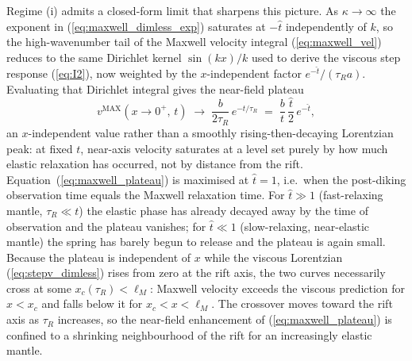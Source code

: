 \documentclass[extra]{gji}
\begin{document}
Regime (i) admits a closed-form limit that sharpens this picture. As
$\kappa\to\infty$ the exponent in (\ref{eq:maxwell_dimless_exp}) saturates
at $-\hat{t}$ independently of $k$, so the high-wavenumber tail of the
Maxwell velocity integral (\ref{eq:maxwell_vel}) reduces to the same
Dirichlet kernel $\sin(kx)/k$ used to derive the viscous step response
(\ref{eq:I2}), now weighted by the $x$-independent factor
$e^{-\hat{t}}/(\tau_R a)$.  Evaluating that Dirichlet integral gives the
near-field plateau
\begin{equation}
v^{\text{MAX}}(x\to0^+,\,t) \;\longrightarrow\;
\frac{b}{2\tau_R}\,e^{-t/\tau_R}
\;=\; \frac{b}{t}\,\frac{\hat{t}}{2}\,e^{-\hat{t}},
\label{eq:maxwell_plateau}
\end{equation}
an $x$-independent value rather than a smoothly rising-then-decaying
Lorentzian peak: at fixed $t$, near-axis velocity saturates at a level set
purely by how much elastic relaxation has occurred, not by distance from
the rift.  Equation~(\ref{eq:maxwell_plateau}) is maximised at
$\hat{t}=1$, i.e.\ when the post-diking observation time equals the
Maxwell relaxation time.  For $\hat{t}\gg1$ (fast-relaxing mantle,
$\tau_R\ll t$) the elastic phase has already decayed away by the time of
observation and the plateau vanishes; for $\hat{t}\ll1$ (slow-relaxing,
near-elastic mantle) the spring has barely begun to release and the
plateau is again small.  Because the plateau is independent of $x$ while
the viscous Lorentzian (\ref{eq:stepv_dimless}) rises from zero at the
rift axis, the two curves necessarily cross at some $x_c(\tau_R)<\ell_M$:
Maxwell velocity exceeds the viscous prediction for $x<x_c$ and falls
below it for $x_c<x<\ell_M$.  The crossover moves toward the rift axis as
$\tau_R$ increases, so the near-field enhancement of
(\ref{eq:maxwell_plateau}) is confined to a shrinking neighbourhood of the
rift for an increasingly elastic mantle.
\end{document}
